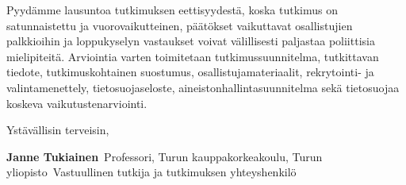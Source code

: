 Pyydämme lausuntoa tutkimuksen eettisyydestä, koska tutkimus on satunnaistettu ja vuorovaikutteinen, päätökset vaikuttavat osallistujien palkkioihin ja loppukyselyn vastaukset voivat välillisesti paljastaa poliittisia mielipiteitä. Arviointia varten toimitetaan tutkimussuunnitelma, tutkittavan tiedote, tutkimuskohtainen suostumus, osallistujamateriaalit, rekrytointi- ja valintamenettely, tietosuojaseloste, aineistonhallintasuunnitelma sekä tietosuojaa koskeva vaikutustenarviointi.

\vfill
Ystävällisin terveisin,

\vspace{1.2em}
\textbf{Janne Tukiainen}\
Professori, Turun kauppakorkeakoulu, Turun yliopisto\
Vastuullinen tutkija ja tutkimuksen yhteyshenkilö\
\StudyEmail\
\StudyPhone


